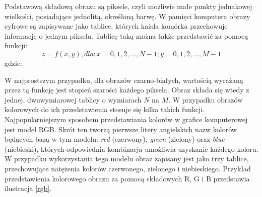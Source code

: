 Podstawową składową obrazu są piksele, czyli możliwie małe punkty jednakowej wielkości, posiadające jednolitą, określoną barwę. W pamięci komputera obrazy cyfrowe są zapisywane jako tablice, których każda komórka przechowuje informację o jednym pikselu. Tablicę taką można także przedstawić za pomocą funkcji:
\begin{equation}
	z = f(x,y), dla: x = 0, 1, 2, ..., N-1; y = 0, 1, 2, ..., M-1
   \label{funkcja_obrazu}
 \end{equation}
 gdzie:  
 \begin{equationDescriptor}
 \end{equationDescriptor}
 
W najprostszym przypadku, dla obrazów czarno-białych, wartością wyrażaną przez tą funkcję jest stopień szarości każdego piksela. Obraz składa się wtedy z jednej, dwuwymiarowej tablicy o wymiarach $N$ na $M$.
W przypadku obrazów kolorowych do ich przedstawienia stosuje się kilka takich funkcji. Najpopularniejszym sposobem przedstawiania kolorów w grafice komputerowej jest model RGB. Skrót ten tworzą pierwsze litery angielskich nazw kolorów będących bazą w tym modelu: \textit{red} (czerwony), \textit{green} (zielony) oraz \textit{blue} (niebieski), których odpowiednia kombinacja umożliwia uzyskanie każdego koloru. W przypadku wykorzystania tego modelu obraz zapisany jest jako trzy tablice, przechowujące natężenia kolorów czerwonego, zielonego i niebieskiego. Przykład przedstawienia kolorowego obrazu za pomocą składowych R, G i B przedstawia ilustracja \ref{rgb}.


